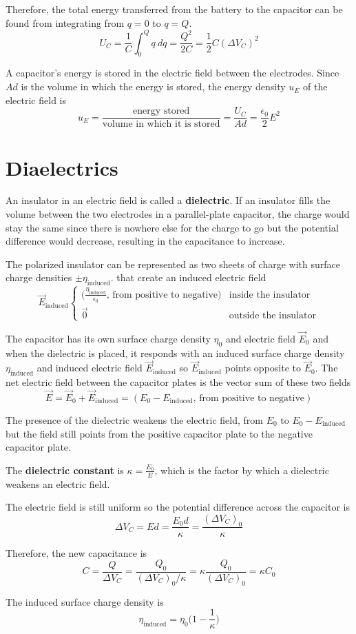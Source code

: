 \documentclass{article}
\begin{document}
Therefore, the total energy transferred from the battery to the capacitor can be found from
integrating from $q=0$ to $q=Q$.
\[U_C=\frac{1}{C}\int_{0}^{Q}q\: dq=\frac{Q^2}{2C}=\frac{1}{2}C(\Delta V_C)^2\]

A capacitor's energy is stored in the electric field between the electrodes. Since $Ad$ is the
volume in which the energy is stored, the energy density $u_E$ of the electric field is
\[u_E=\frac{\text{energy stored}}{\text{volume in which it is stored}}=\frac{U_C}{Ad}=
\frac{\epsilon_0}{2}E^2\]
\section*{Diaelectrics}

An insulator in an electric field is called a \textbf{dielectric}. If an insulator fills the volume
between the two electrodes in a parallel-plate capacitor, the charge would stay the same since
there is nowhere else for the charge to go but the potential difference would decrease, resulting
in the capacitance to increase.
\newline

The polarized insulator can be represented as two sheets of charge with surface charge densities
$\pm \eta_\text{induced}$. that create an induced electric field
\[\vec{E}_\text{induced}\begin{cases}
    \Big(\frac{\eta_\text{induced}}{\epsilon_0}\text{, from positive to negative}\Big) &
    \text{inside the insulator} \\
    \vec{0} & \text{outside the insulator}
\end{cases}\]

The capacitor has its own surface charge density $\eta_0$ and electric field $\vec{E}_0$ and when
the dielectric is placed, it responds with an induced surface charge density $\eta_\text{induced}$
and induced electric field $\vec{E}_\text{induced}$ so $\vec{E}_\text{induced}$ points opposite to
$\vec{E}_0$. The net electric field between the capacitor plates is the vector sum of these two
fields
\[\vec{E}=\vec{E}_0 + \vec{E}_\text{induced} = (E_0-E_\text{induced}
\text{, from positive to negative})\]

The presence of the dielectric weakens the electric field, from $E_0$ to $E_0 - E_\text{induced}$
but the field still points from the positive capacitor plate to the negative capacitor plate.
\newline

The \textbf{dielectric constant} is $\kappa = \frac{E_0}{E}$, which is the factor by which a
dielectric weakens an electric field.
\newline

The electric field is still uniform so the potential difference across the capacitor is
\[\Delta V_C=Ed=\frac{E_0 d}{\kappa}=\frac{(\Delta V_C)_0}{\kappa}\]

Therefore, the new capacitance is
\[C=\frac{Q}{\Delta V_C}=\frac{Q_0}{(\Delta V_C)_0 / \kappa}=\kappa \frac{Q_0}{(\Delta V_C)_0}=
\kappa C_0\]

The induced surface charge density is
\[\eta_\text{induced}=\eta_0 \Big(1-\frac{1}{\kappa}\Big)\]
\end{document}

